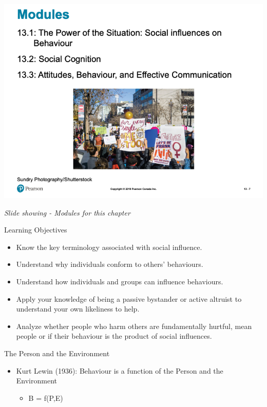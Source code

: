 \documentclass[
]{book}
\providecommand{\tightlist}{%
  \setlength{\itemsep}{0pt}\setlength{\parskip}{0pt}}
\begin{document}
\begin{reflect}
\includegraphics{assets/unit_6/slide_7.png}

\emph{Slide showing - Modules for this chapter}

Learning Objectives

\begin{itemize}
\tightlist
\item
  Know the key terminology associated with social influence.\\
\item
  Understand why individuals conform to others' behaviours.\\
\item
  Understand how individuals and groups can influence behaviours.\\
\item
  Apply your knowledge of being a passive bystander or active altruist to understand your own likeliness to help.\\
\item
  Analyze whether people who harm others are fundamentally hurtful, mean people or if their behaviour is the product of social influences.
\end{itemize}

The Person and the Environment

\begin{itemize}
\tightlist
\item
  Kurt Lewin (1936): Behaviour is a function of the Person and the Environment

  \begin{itemize}
  \tightlist
  \item
    B = f(P,E)
  \end{itemize}
\end{itemize}


\end{reflect}
\end{document}

